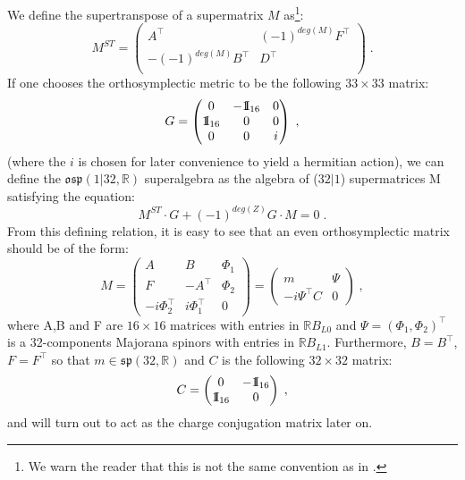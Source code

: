 \documentclass[a4paper,11pt]{article}
\def\Id{{\rm 1\kern-.28em I}}
\begin{document}
We define the supertranspose of a supermatrix $M$ as\footnote{We warn the reader that this is not the same convention 
as in \cite{Azu}.}:
$$
M^{ST}=\begin{pmatrix}
A^{\top} & (-1)^{deg(M)} F^{\top}\\
-(-1)^{deg(M)} B^{\top} & D^{\top} \\
\end{pmatrix}\;.
$$
If one chooses the orthosymplectic metric to be the following $33 \times 33$ matrix:
$$
G=\begin{pmatrix}
0 & -\Id_{16} & 0\\
\Id_{16} & 0 & 0\\
0 & 0 & i
\end{pmatrix}\;,
$$
(where the $i$ is chosen for later convenience to yield a hermitian action),
we can define the $\mathfrak{osp}(1|32,\mathbb{R})$ superalgebra as the algebra of ($32|1$) supermatrices M satisfying 
the equation:
$$M^{ST} \cdot G + (-1)^{deg(Z)} G \cdot M = 0 \;.$$
From this defining relation, it is easy to see that an even orthosymplectic matrix should be of the form:
\begin{equation}\label{mpsi}
M=\begin{pmatrix}
A & B & \Phi_1\\
F & -A^{\top} & \Phi_2\\
-i\Phi_2^{\top} & i\Phi_1^{\top} & 0
\end{pmatrix}=
\begin{pmatrix}
m & \Psi \\
-i \Psi^{\top} C & 0
\end{pmatrix}\;,
\end{equation}
where A,B and F are $16 \times 16$ matrices with entries in $\mathbb{R}B_{L0}$ and $\Psi=(\Phi_1,\Phi_2)^{\top}$ is 
a 32-components Majorana spinors with entries in $\mathbb{R}B_{L1}$. Furthermore, $B=B^{\top}$, $F=F^{\top}$ so that 
$m \in \mathfrak{sp}(32,\mathbb{R})$ and $C$ is the following 
$32\times 32$ matrix:
\begin{equation}\label{Cdef}
C=\begin{pmatrix}
0 & -\Id_{16} \\
\Id_{16} & 0 
\end{pmatrix} \;,
\end{equation}
and will turn out to act as the charge conjugation matrix later on.
\end{document}
